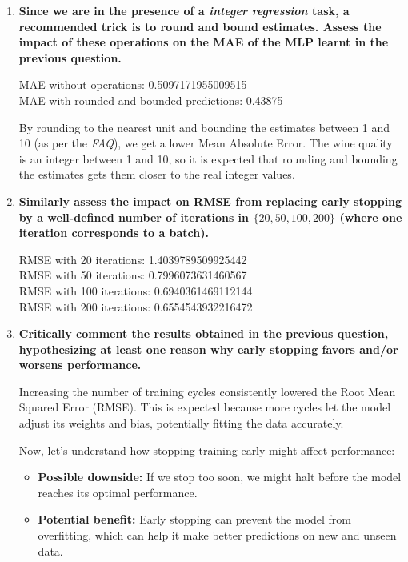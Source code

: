 \documentclass[12pt]{article}
\begin{document}
\begin{enumerate}[leftmargin=\labelsep]
    \item \textbf{Since we are in the presence of a \textit{integer regression} task, a recommended trick is to
          round and bound estimates. Assess the impact of these operations on the MAE of the MLP learnt in the previous question.}

          \vskip 0.3cm
          

          MAE without operations: 0.5097171955009515 \\
          MAE with rounded and bounded predictions: 0.43875

          \vskip 0.2cm
          By rounding to the nearest unit and bounding the estimates between 1 and 10 (as per the \textit{FAQ}), we get a lower Mean Absolute Error.
          The wine quality is an integer between 1 and 10, so it is expected that rounding and bounding the estimates gets them closer to the real integer values.

    \item \textbf{Similarly assess the impact on RMSE from replacing early stopping by a well-defined
          number of iterations in $\{20,50,100,200\}$ (where one iteration corresponds to a batch).}

          \vskip 0.3cm
          

          RMSE with 20 iterations: 1.4039789509925442  \\
          RMSE with 50 iterations: 0.7996073631460567  \\
          RMSE with 100 iterations: 0.6940361469112144 \\
          RMSE with 200 iterations: 0.6554543932216472

    \item \textbf{Critically comment the results obtained in the previous question, hypothesizing at least
          one reason why early stopping favors and/or worsens performance.}

          \vskip 0.3cm
          Increasing the number of training cycles consistently lowered the Root Mean Squared Error (RMSE).
          This is expected because more cycles let the model adjust its weights and bias, potentially fitting the data accurately.

          Now, let's understand how stopping training early might affect performance:

          \begin{itemize}
            \item \textbf{Possible downside:} If we stop too soon, we might halt before the model reaches its optimal performance.
            \item \textbf{Potential benefit:} Early stopping can prevent the model from overfitting, which can help it make better predictions on new and unseen data.
          \end{itemize}
\end{enumerate}
\end{document}
